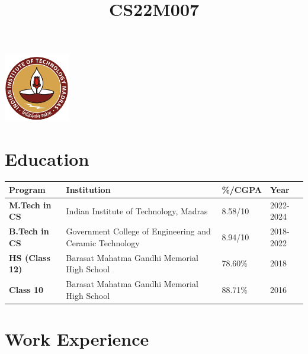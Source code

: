 \documentclass[10pt, a4paper]{moderncv}
\title{CS22M007}
\begin{document}
\hypersetup{
    linkcolor=blue,
    filecolor=magenta,      
    urlcolor=cyan,
}

\noindent
\begin{minipage}{.78\textwidth}
 \makecvtitle
\end{minipage}%
\begin{minipage}{.30\textwidth}
  \centering
  \includegraphics[height=3cm]{iitm.png}
\end{minipage}
\vspace{-1em}

\section{Education}
\vspace{0.3em}
\begin{minipage}{\textwidth}
\centering
\setlength{\tabcolsep}{10pt}
\begin{tabular}{|p{3cm}|p{8cm}|p{2cm}|p{3cm}|}
\hline
\textbf{Program} & \textbf{Institution} & \textbf{\%/CGPA} & \textbf{Year} \\ \hline
\textbf{M.Tech in CS} & Indian Institute of Technology, Madras & 8.58/10 & 2022-2024 \\ \hline
\textbf{B.Tech in CS} & Government College of Engineering and Ceramic Technology & 8.94/10 & 2018-2022 \\ \hline
\textbf{HS (Class 12)} & Barasat Mahatma Gandhi Memorial High School & 78.60\% & 2018 \\\hline
\textbf{Class 10} & Barasat Mahatma Gandhi Memorial High School & 88.71\% & 2016 \\
\hline
\end{tabular}

\end{minipage}

\vspace{1em}
\section{Work Experience}
\end{document}
